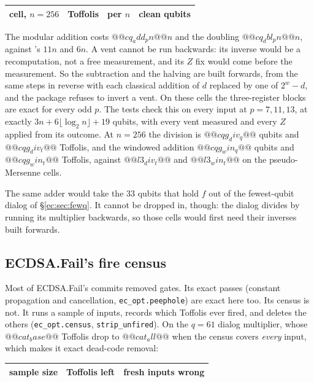 \begin{center}\small
\begin{tabular}{lrrr}
\toprule
cell, $n=256$ & Toffolis & per $n$ & clean qubits\\
\midrule
\bottomrule
\end{tabular}
\end{center}

\noindent The modular addition costs $@@cq_add_pn@@n$ and the doubling $@@cq_dbl_pn@@n$, against
\cite{ec:luo26}'s $11n$ and $6n$. A vent cannot be run backwards: its inverse would be a
recomputation, not a free measurement, and its $Z$ fix would come before the measurement. So the
subtraction and the halving are built forwards, from the same steps in reverse with each classical
addition of $d$ replaced by one of $2^w-d$, and the package refuses to invert a vent. On these cells
the three-register blocks are exact for every odd $p$. The tests check this on every input at
$p=7,11,13$, at exactly $3n+6\lfloor\log_2n\rfloor+19$ qubits, with every vent measured and every $Z$
applied from its outcome. At $n=256$ the division is $@@cqg_div_q@@$ qubits and $@@cqg_div_t@@$
Toffolis, and the windowed addition $@@cqg_win_q@@$ qubits and $@@cqg_win_t@@$ Toffolis, against
$@@l3_div_t@@$ and $@@l3_win_t@@$ on the pseudo-Mersenne cells.

The same adder would take the $33$ qubits that hold $f$ out of the fewest-qubit dialog of
\S\ref{ec:sec:fewq}. It cannot be dropped in, though: the dialog divides by running its
multiplier backwards, so those cells would first need their inverses built forwards.

\subsection{ECDSA.Fail's fire census}

Most of ECDSA.Fail's commits removed gates. Its exact passes (constant propagation and
cancellation, \texttt{ec\_opt.peephole}) are exact here too. Its census is not. It runs a sample of
inputs, records which Toffolis ever fired, and deletes the others (\texttt{ec\_opt.census},
\texttt{strip\_unfired}). On the $q=61$ dialog multiplier, whose $@@cat_base@@$ Toffolis drop to
$@@cat_all@@$ when the census covers \emph{every} input, which makes it exact dead-code removal:

\begin{center}\small
\begin{tabular}{rrr}
\toprule
sample size & Toffolis left & fresh inputs wrong\\
\midrule
\bottomrule
\end{tabular}
\end{center}

